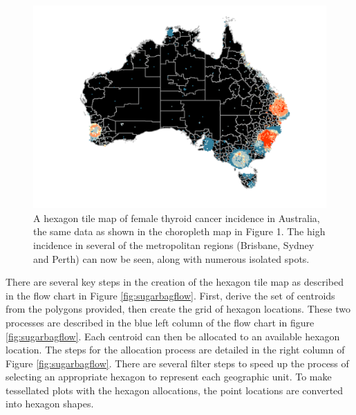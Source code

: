 \begin{figure}
\includegraphics[width=0.95\linewidth]{kobakian-cook_files/figure-latex/hexmap-1} \caption{A hexagon tile map of female thyroid cancer incidence in Australia, the same data as shown in the choropleth map in Figure 1. The high incidence in several of the metropolitan regions (Brisbane, Sydney and Perth) can now be seen, along with numerous isolated spots.}\label{fig:hexmap}
\end{figure}

There are several key steps in the creation of the hexagon tile map as described in the flow chart in Figure \ref{fig:sugarbagflow}. First, derive the set of centroids from the polygons provided, then create the grid of hexagon locations. These two processes are described in the blue left column of the flow chart in figure \ref{fig:sugarbagflow}. Each centroid can then be allocated to an available hexagon location. The steps for the allocation process are detailed in the right column of Figure \ref{fig:sugarbagflow}. There are several filter steps to speed up the process of selecting an appropriate hexagon to represent each geographic unit. To make tessellated plots with the hexagon allocations, the point locations are converted into hexagon shapes.


